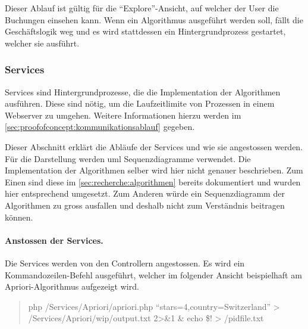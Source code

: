 Dieser Ablauf ist gültig für die "`Explore"'-Ansicht, auf welcher der User die Buchungen einsehen kann. Wenn ein Algorithmus ausgeführt werden soll, fällt die Geschäftslogik weg und es wird stattdessen ein Hintergrundprozess gestartet, welcher sie ausführt.

\subsubsection{Services}
\label{sec:proofofconcept:architektur:services}
Services sind Hintergrundprozesse, die die Implementation der Algorithmen ausführen. Diese sind nötig, um die Laufzeitlimite von Prozessen in einem Webserver zu umgehen. Weitere Informationen hierzu werden im \cref{sec:proofofconcept:kommunikationsablauf} gegeben.

Dieser Abschnitt erklärt die Abläufe der Services und wie sie angestossen werden. Für die Darstellung werden \gls{uml} Sequenzdiagramme verwendet. Die Implementation der Algorithmen selber wird hier nicht genauer beschrieben. Zum Einen sind diese im \cref{sec:recherche:algorithmen} bereits dokumentiert und wurden hier entsprechend umgesetzt. Zum Anderen würde ein Sequenzdiagramm der Algorithmen zu gross ausfallen und deshalb nicht zum Verständnis beitragen können.


\paragraph{Anstossen der Services.}
Die Services werden von den Controllern angestossen. Es wird ein Kommandozeilen-Befehl ausgeführt, welcher im folgender Ansicht beispielhaft am Apriori-Algorithmus aufgezeigt wird.

\blockquote[]{
php /Services/Apriori/apriori.php ``stars=4,country=Switzerland'' > /Services/Apriori/wip/output.txt 2>\&1 \& echo \$! > /pidfile.txt
}

